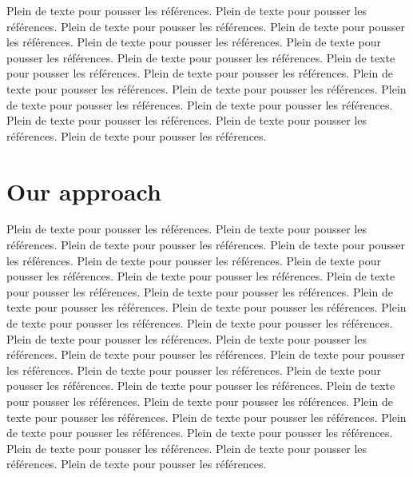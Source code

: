 \documentclass[conference]{acmsiggraph}
\begin{document}
Plein de texte pour pousser les références.
Plein de texte pour pousser les références.
Plein de texte pour pousser les références.
Plein de texte pour pousser les références.
Plein de texte pour pousser les références.
Plein de texte pour pousser les références.
Plein de texte pour pousser les références.
Plein de texte pour pousser les références.
Plein de texte pour pousser les références.
Plein de texte pour pousser les références.
Plein de texte pour pousser les références.
Plein de texte pour pousser les références.
Plein de texte pour pousser les références.
Plein de texte pour pousser les références.
Plein de texte pour pousser les références.
Plein de texte pour pousser les références.

\section{Our approach}

Plein de texte pour pousser les références.
Plein de texte pour pousser les références.
Plein de texte pour pousser les références.
Plein de texte pour pousser les références.
Plein de texte pour pousser les références.
Plein de texte pour pousser les références.
Plein de texte pour pousser les références.
Plein de texte pour pousser les références.
Plein de texte pour pousser les références.
Plein de texte pour pousser les références.
Plein de texte pour pousser les références.
Plein de texte pour pousser les références.
Plein de texte pour pousser les références.
Plein de texte pour pousser les références.
Plein de texte pour pousser les références.
Plein de texte pour pousser les références.
Plein de texte pour pousser les références.
Plein de texte pour pousser les références.
Plein de texte pour pousser les références.
Plein de texte pour pousser les références.
Plein de texte pour pousser les références.
Plein de texte pour pousser les références.
Plein de texte pour pousser les références.
Plein de texte pour pousser les références.
Plein de texte pour pousser les références.
Plein de texte pour pousser les références.
Plein de texte pour pousser les références.
Plein de texte pour pousser les références.
Plein de texte pour pousser les références.


\nocite{*}

\end{document}
